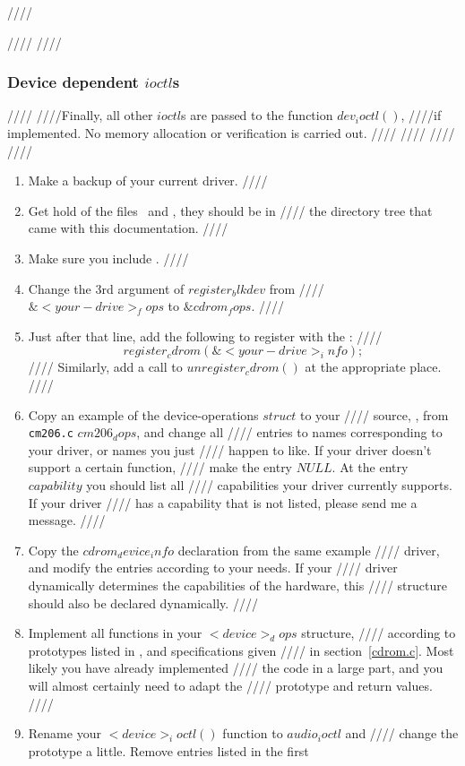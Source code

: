 ////\documentclass{article}
\begin{document}
////
////\subsubsection{Device dependent $ioctl$s}
////
////Finally, all other $ioctl$s are passed to the function $dev_ioctl()$,
////if implemented. No memory allocation or verification is carried out. 
////
////
////
////\begin{enumerate}
////\item Make a backup of your current driver. 
////\item Get hold of the files \cdromc\ and \cdromh, they should be in
////  the directory tree that came with this documentation.
////\item Make sure you include \cdromh.
////\item Change the 3rd argument of $register_blkdev$ from
////$\&<your-drive>_fops$ to $\&cdrom_fops$. 
////\item Just after that line, add the following to register with the \UCD:
////  $$register_cdrom(\&<your-drive>_info);$$
////  Similarly, add a call to $unregister_cdrom()$ at the appropriate place.
////\item Copy an example of the device-operations $struct$ to your
////  source, \eg, from {\tt {cm206.c}} $cm206_dops$, and change all
////  entries to names corresponding to your driver, or names you just
////  happen to like. If your driver doesn't support a certain function,
////  make the entry $NULL$. At the entry $capability$ you should list all
////  capabilities your driver currently supports. If your driver
////  has a capability that is not listed, please send me a message.
////\item Copy the $cdrom_device_info$ declaration from the same example
////  driver, and modify the entries according to your needs. If your
////  driver dynamically determines the capabilities of the hardware, this
////  structure should also be declared dynamically. 
////\item Implement all functions in your $<device>_dops$ structure,
////  according to prototypes listed in \cdromh, and specifications given
////  in section~\ref{cdrom.c}. Most likely you have already implemented
////  the code in a large part, and you will almost certainly need to adapt the
////  prototype and return values.
////\item Rename your $<device>_ioctl()$ function to $audio_ioctl$ and
////  change the prototype a little. Remove entries listed in the first

\end{enumerate}
\end{document}
